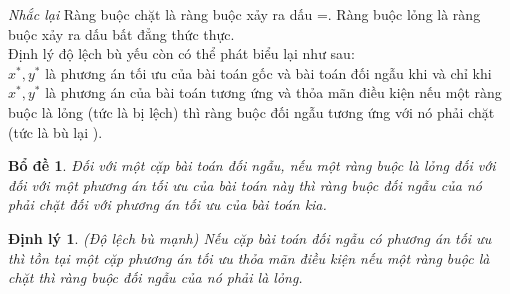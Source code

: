 \documentclass[12pt,a4paper]{report}
\newtheorem{dl}{Định lý}
\newtheorem{bd}{Bổ đề}
\begin{document}
    \textit{Nhắc lại} Ràng buộc chặt là ràng buộc xảy ra dấu =. Ràng buộc lỏng là ràng buộc xảy ra dấu bất đẳng thức thực.\\
    Định lý độ lệch bù yếu còn có thể phát biểu lại như sau:\\
    $x^*,y^*$ là phương án tối ưu của bài toán gốc và bài toán đối ngẫu khi và chỉ khi $x^*,y^*$ là phương án của bài toán tương ứng và thỏa mãn điều kiện nếu một ràng buộc là lỏng (tức là bị lệch) thì ràng buộc đối ngẫu tương ứng với nó phải chặt (tức là bù lại ).\\
    \begin{bd}
        Đối với một cặp bài toán đối ngẫu, nếu một ràng buộc là lỏng đối với đối với một phương án tối ưu của bài toán này thì ràng buộc đối ngẫu của nó phải chặt đối với phương án tối ưu của bài toán kia.\\
    \end{bd}
     \begin{dl}
        (Độ lệch bù mạnh) Nếu cặp bài toán đối ngẫu có phương án tối ưu thì tồn tại một cặp phương án tối ưu thỏa mãn điều kiện nếu một ràng buộc là chặt thì ràng buộc đối ngẫu của nó phải là lỏng.\\
        
    \end{dl}
\end{document}

